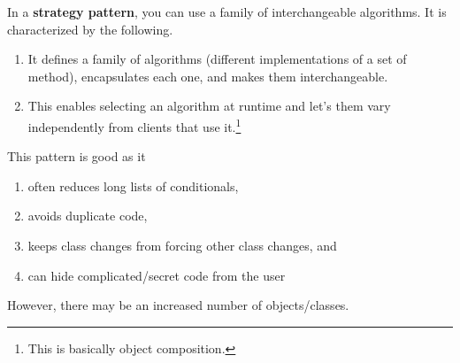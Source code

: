     \begin{definition} 
      In a \textbf{strategy pattern}, you can use a family of interchangeable algorithms. It is characterized by the following. 
      \begin{enumerate}
        \item It defines a family of algorithms (different implementations of a set of method), encapsulates each one, and makes them interchangeable. 
        \item This enables selecting an algorithm at runtime and let's them vary independently from clients that use it.\footnote{This is basically object composition. }
      \end{enumerate}
    \end{definition} 

    This pattern is good as it 
    \begin{enumerate}
      \item often reduces long lists of conditionals, 
      \item avoids duplicate code, 
      \item keeps class changes from forcing other class changes, and 
      \item can hide complicated/secret code from the user
    \end{enumerate}

    However, there may be an increased number of objects/classes. 

